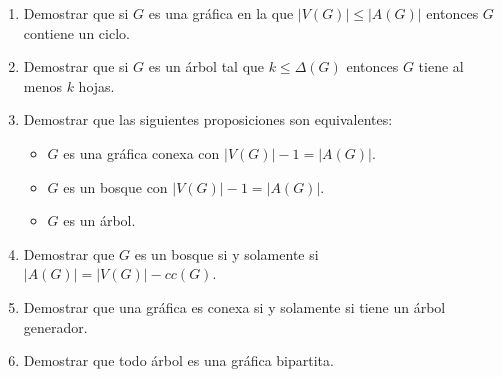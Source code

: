 \documentclass[12pt]{report}
\begin{document}
\begin{enumerate}

\item Demostrar que si $G$ es una gráfica en la que $|V(G)| \leq |A(G)|$ entonces $G$ contiene un ciclo.


\item Demostrar que si $G$ es un árbol tal que $k \leq \Delta(G)$ entonces $G$ tiene al menos $k$ hojas.

\item Demostrar que las siguientes proposiciones son equivalentes:
\begin{itemize}
\item $G$ es una gráfica conexa con $|V(G)|-1 = |A(G)|$.
\item $G$ es un bosque con $|V(G)|-1 = |A(G)|$.
\item $G$ es un árbol.
\end{itemize}

\item Demostrar que $G$ es un bosque si y solamente si $|A(G)| = |V(G)|-cc(G)$.

%

\item Demostrar que una gráfica es conexa si y solamente si tiene un árbol generador.

\item Demostrar que todo árbol es una gráfica bipartita.
\end{enumerate}
\end{document}
